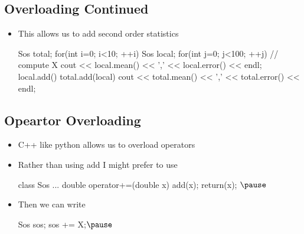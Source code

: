 
\begin{slide}
\section{Overloading Continued}
  
  \begin{itemize}
  \item This allows us to add second order statistics
    \begin{cpp}
      Sos total;
      for(int i=0; i<10; ++i) {
        Sos local;
        for(int j=0; j<100; ++j) {
          // compute X
          cout << local.mean() << ',' << local.error() << endl;
          local.add()
        }
        total.add(local)
        cout << total.mean() << ',' << total.error() << endl;
      }
    \end{cpp}
  \end{itemize}

\end{slide}


\begin{slide}
\section{Opeartor Overloading}

\begin{PauseHighLight}
  \begin{itemize}
  \item C++ like python allows us to overload operators\pause
  \item Rather than using add I might prefer to use
    \begin{cpp}
      class Sos {
        ...
        double operator+=(double x) { add(x); return(x); }
      }$\pause$
    \end{cpp}
  \item Then we can write
    \begin{cpp}
      Sos sos;
      sos += X;$\pause$
    \end{cpp}
  \end{itemize}
\end{PauseHighLight}

\end{slide}


